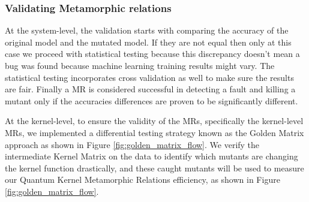 \documentclass[12pt,a4paper]{article}
\begin{document}
	
	
	
	\subsubsection{Validating Metamorphic relations}
	\label{sec:validating_metamorphic_relations}

At the system-level, the validation starts with comparing the accuracy of the original model and the mutated model. If they are not equal then only at this case we proceed with statistical testing because this discrepancy doesn't mean a bug was found because machine learning training results might vary. The statistical testing incorporates cross validation as well to make sure the results are fair. Finally a MR is considered successful in detecting a fault and killing a mutant only if the accuracies differences are proven to be significantly different.

At the kernel-level, to ensure the validity of the MRs, specifically the kernel-level MRs, we implemented a differential testing strategy \cite{mckeeman1998} known as the Golden Matrix approach as shown in Figure \ref{fig:golden_matrix_flow}. We verify the intermediate Kernel Matrix \cite{wang2021} on the data to identify which mutants are changing the kernel function drastically, and these caught mutants will be used to measure our Quantum Kernel Metamorphic Relations efficiency, as shown in Figure \ref{fig:golden_matrix_flow}. 
	
\end{document}
